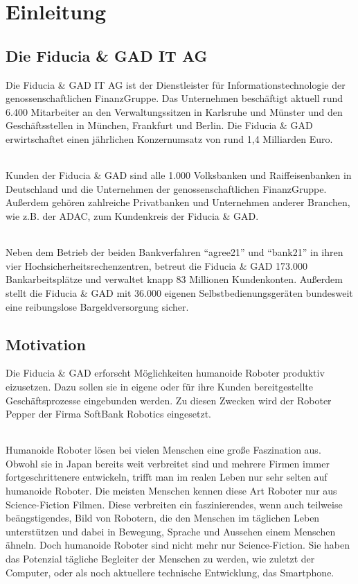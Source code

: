 \chapter{Einleitung}\label{sec:einleitung}
\section{Die Fiducia \& GAD IT AG}\label{sec:fiducia-gad}
Die Fiducia \& GAD IT AG ist der Dienstleister für Informationstechnologie der
genossenschaftlichen FinanzGruppe. Das Unternehmen beschäftigt aktuell rund
6.400 Mitarbeiter an den Verwaltungssitzen in Karlsruhe und Münster und den
Geschäftsstellen in München, Frankfurt und Berlin. Die Fiducia \& GAD
erwirtschaftet einen jährlichen Konzernumsatz von rund 1,4 Milliarden Euro.

\subparagraph{}
Kunden der Fiducia \& GAD sind alle 1.000 Volksbanken und Raiffeisenbanken in
Deutschland und die Unternehmen der genossenschaftlichen FinanzGruppe. Außerdem
gehören zahlreiche Privatbanken und Unternehmen anderer Branchen, wie z.B. der
ADAC, zum Kundenkreis der Fiducia \& GAD.

\subparagraph{}
Neben dem Betrieb der beiden Bankverfahren "`agree21"' und "`bank21"' in ihren
vier Hochsicherheitsrechenzentren, betreut die Fiducia \& GAD 173.000
Bankarbeitsplätze und verwaltet knapp 83 Millionen Kundenkonten. Außerdem stellt
die Fiducia \& GAD mit 36.000 eigenen Selbstbedienungsgeräten bundesweit eine
reibungslose Bargeldversorgung sicher. \cite{FiduciaGAD2018}

\section{Motivation}\label{sec:motivation}
Die Fiducia \& GAD erforscht Möglichkeiten humanoide Roboter produktiv
eizusetzen. Dazu sollen sie in eigene oder für ihre Kunden bereitgestellte
Geschäftsprozesse eingebunden werden. Zu diesen Zwecken wird der Roboter Pepper
der Firma SoftBank Robotics eingesetzt.

\subparagraph{}
Humanoide Roboter lösen bei vielen Menschen eine große Faszination aus. Obwohl
sie in Japan bereits weit verbreitet sind und mehrere Firmen immer
fortgeschrittenere entwickeln, trifft man im realen Leben nur sehr selten auf
humanoide Roboter. Die meisten Menschen kennen diese Art Roboter nur aus
Science-Fiction Filmen. Diese verbreiten ein faszinierendes, wenn auch teilweise
beängstigendes, Bild von Robotern, die den Menschen im täglichen Leben
unterstützen und dabei in Bewegung, Sprache und Aussehen einem Menschen ähneln.
Doch humanoide Roboter sind nicht mehr nur Science-Fiction. Sie haben das
Potenzial tägliche Begleiter der Menschen zu werden, wie zuletzt der Computer,
oder als noch aktuellere technische Entwicklung, das Smartphone.

